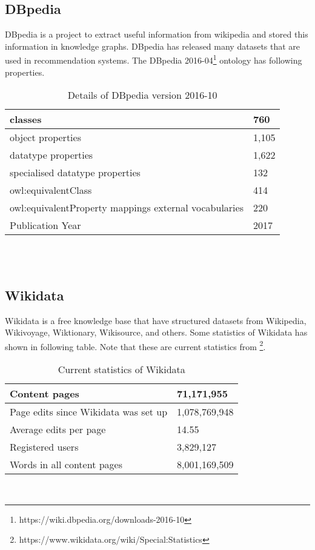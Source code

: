 \subsection{DBpedia}
DBpedia is a project to extract useful information from wikipedia and stored this information in knowledge graphs. DBpedia has released many datasets that are used in recommendation systems. 
The DBpedia 2016-04\footnote{https://wiki.dbpedia.org/downloads-2016-10} ontology has following properties.
\\
\begin{table}[!htbp] 
\centering
\footnotesize
\def\arraystretch{1.4}%
\centering
\begin{tabular}{|p{7cm}|p{3cm}|}
\hline
classes &760 
\\
\hline 
object properties & 1,105 
\\
\hline 
datatype properties & 1,622
\\
\hline 
specialised datatype properties  & 132 
\\
\hline 
owl:equivalentClass & 414 
\\
\hline
owl:equivalentProperty mappings external vocabularies & 220 
\\
\hline
Publication Year & 2017
\\
\hline
\end{tabular}

\caption{Details of DBpedia version 2016-10}
\label{table:14}
\end{table}
\\
\cite{N15} \cite{N13}
\\
\subsection{Wikidata}
Wikidata is a free knowledge base that have structured datasets from Wikipedia, Wikivoyage, Wiktionary, Wikisource, and others. Some statistics of Wikidata has shown in following table. Note that these are current statistics from \footnote{https://www.wikidata.org/wiki/Special:Statistics}.
\\
\begin{table}[!htbp] 
\centering
\footnotesize
\def\arraystretch{1.4}%
\centering
\begin{tabular}{|p{7cm}|p{3cm}|}
\hline
Content pages & 71,171,955 
\\
\hline 
Page edits since Wikidata was set up & 1,078,769,948
\\
\hline 
Average edits per page & 14.55
\\
\hline 
Registered users  & 3,829,127
\\
\hline 
Words in all content pages & 8,001,169,509
\\
\hline
\end{tabular}

\caption{Current statistics of Wikidata}
\label{table:14}
\end{table}
\\
\cite{N13}
